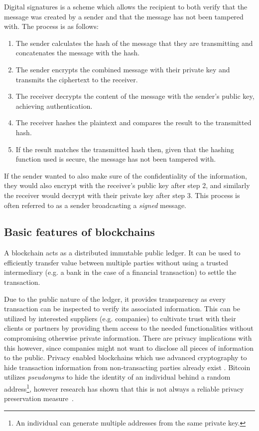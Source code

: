 \begin{enumerate}
    
    Digital signatures is a scheme which allows the recipient to both verify that the message was created by a sender and that the message has not been tampered with. 
    The process is as follows:
    \begin{enumerate}
        \item The sender calculates the hash of the message that they are transmitting and concatenates the message with the hash.
        \item The sender encrypts the combined message with their private key and transmits the ciphertext to the receiver.
        \item The receiver decrypts the content of the message with the sender's public key, achieving authentication.
        \item The receiver hashes the plaintext and compares the result to the transmitted hash.
        \item If the result matches the transmitted hash  then, given that the hashing function used is secure, the message has not been tampered with.
    \end{enumerate}
    If the sender wanted to also make sure of the confidentiality of the information, they would also encrypt with the receiver's public key after step 2, and similarly the receiver would decrypt with their private key after step 3. This process is often referred to as a sender broadcasting a \textit{signed} message.

\end{enumerate}

\subsection{Basic features of blockchains} \label{advantages}
A blockchain acts as a distributed immutable public ledger. It can be used to efficiently transfer value between multiple parties without using a trusted intermediary (e.g. a bank in the case of a financial transaction) to settle the transaction. 

Due to the public nature of the ledger, it provides transparency as every transaction can be inspected to verify its associated information. This can be utilized by interested suppliers (e.g. companies) to cultivate trust with their clients or partners by providing them access to the needed functionalities without compromising otherwise private information. There are privacy implications with this however, since companies might not want to disclose all pieces of information to the public. Privacy enabled blockchains which use advanced cryptography to hide transaction information from non-transacting parties already exist \cite{monero, zcash, pivx} . Bitcoin utilizes \textit{pseudonyms} to hide the identity of an individual behind a random address\footnote{An individual can generate multiple addresses from the same private key.}, however research has shown that this is not always a reliable privacy preservation measure~\cite{journals/corr/abs-1107-4524, DBLP:journals/corr/abs-1708-04748}.

